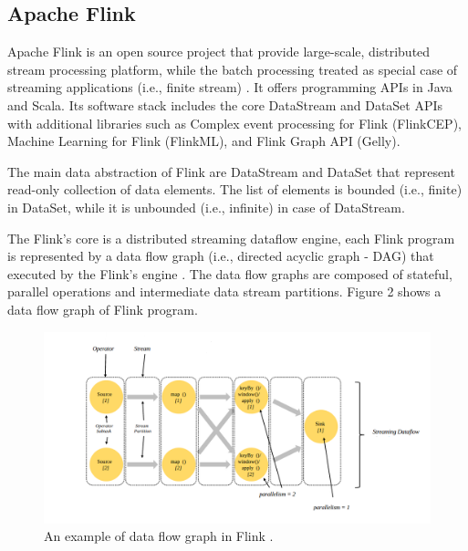 \documentclass[]{article}
\begin{document}
\subsection{Apache Flink}

\par Apache Flink is an open source project that provide large-scale, distributed stream processing platform, while the batch processing treated as special case of streaming applications (i.e., finite stream)  \cite{flink}.
It offers programming APIs in Java and Scala. Its software stack includes the core DataStream and DataSet APIs with additional libraries such as Complex event processing for Flink (FlinkCEP), Machine Learning for Flink (FlinkML), and Flink Graph API (Gelly).

\par The main data abstraction of Flink are DataStream and DataSet that represent read-only collection of data elements. The list of elements is bounded (i.e., finite) in DataSet, while it is unbounded (i.e., infinite) in case of DataStream.

\par The Flink's core is a distributed streaming dataflow engine,  each Flink program is represented by a data flow graph (i.e., directed acyclic graph - DAG) that executed by the Flink's engine \cite{flink_paper}. The data flow graphs are composed of stateful, parallel operations and intermediate data stream partitions. Figure 2 shows a data flow graph of Flink program.


\begin{figure}[h]
 
  \centering
    \includegraphics[width=\textwidth, height=.3\textheight]{flink_engine.png}
     \caption{ An example of data flow graph in Flink \cite{flink}.}
\end{figure} 
\end{document}

